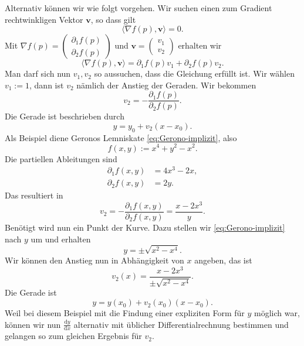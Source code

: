 Alternativ können wir wie folgt vorgehen. Wir suchen einen zum
Gradient rechtwinkligen Vektor $\mathbf v$, so dass gilt%
\[\langle\nabla f(p),\mathbf v\rangle = 0.\]
Mit $\nabla f(p) = \begin{pmatrix}\partial_1 f(p)\\ \partial_2 f(p)\end{pmatrix}$
und $\mathbf v = \begin{pmatrix}v_1\\ v_2\end{pmatrix}$ erhalten wir
\[\langle\nabla f(p),\mathbf v\rangle
= \partial_1 f(p)v_1 + \partial_2 f(p)v_2.\]
Man darf sich nun $v_1,v_2$ so aussuchen, dass die Gleichung erfüllt
ist. Wir wählen $v_1:=1$, dann ist $v_2$ nämlich der Anstieg der
Geraden. Wir bekommen
\[v_2 = -\frac{\partial_1 f(p)}{\partial_2 f(p)}.\]
Die Gerade ist beschrieben durch
\[y = y_0 + v_2(x-x_0).\]
Als Beispiel diene Geronos Lemniskate
\eqref{eq:Gerono-implizit}, also
\[f(x,y) := x^4+y^2-x^2.\]
Die partiellen Ableitungen sind
\begin{align*}
\partial_1 f(x,y) &= 4x^3-2x,\\
\partial_2 f(x,y) &= 2y.
\end{align*}
Das resultiert in
\[v_2 = -\frac{\partial_1 f(x,y)}{\partial_2 f(x,y)}
= \frac{x-2x^3}{y}.\]
Benötigt wird nun ein Punkt der Kurve. Dazu stellen wir
\eqref{eq:Gerono-implizit} nach $y$ um und erhalten
\[y = \pm\sqrt{x^2-x^4}.\]
Wir können den Anstieg nun in Abhängigkeit von $x$ angeben, das ist
\[v_2(x) = \frac{x-2x^3}{\pm\sqrt{x^2-x^4}}.\]
Die Gerade ist
\[y = y(x_0) + v_2(x_0)(x-x_0).\]
Weil bei diesem Beispiel mit die Findung einer expliziten Form für $y$
möglich war, können wir nun $\frac{\mathrm dy}{\mathrm dx}$ alternativ
mit üblicher Differentialrechnung bestimmen und gelangen so zum
gleichen Ergebnis für $v_2$.

